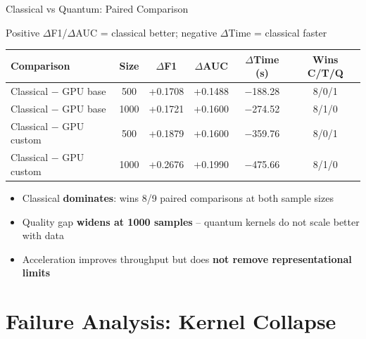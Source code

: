 \documentclass[10pt, aspectratio=169]{beamer}
\begin{document}
\begin{frame}{Classical vs Quantum: Paired Comparison}
    \begin{center}
    {\scriptsize Positive $\Delta$F1/$\Delta$AUC = classical better; negative $\Delta$Time = classical faster}
    \end{center}
    \vspace{-0.1cm}
    \begin{center}
    \small
    \begin{tabular}{lccccc}
        \toprule
        \textbf{Comparison} & \textbf{Size} & $\Delta$\textbf{F1} & $\Delta$\textbf{AUC} & $\Delta$\textbf{Time (s)} & \textbf{Wins C/T/Q} \\
        \midrule
        Classical $-$ GPU base   & 500  & +0.1708 & +0.1488 & $-$188.28 & 8/0/1 \\
        Classical $-$ GPU base   & 1000 & +0.1721 & +0.1600 & $-$274.52 & 8/1/0 \\
        Classical $-$ GPU custom & 500  & +0.1879 & +0.1600 & $-$359.76 & 8/0/1 \\
        Classical $-$ GPU custom & 1000 & +0.2676 & +0.1990 & $-$475.66 & 8/1/0 \\
        \bottomrule
    \end{tabular}
    \end{center}
    \vspace{0.2cm}
    \begin{itemize}
        \item Classical \textbf{dominates}: wins 8/9 paired comparisons at both sample sizes
        \item Quality gap \textbf{widens at 1000 samples} -- quantum kernels do not scale better with data
        \item Acceleration improves throughput but does \textbf{not remove representational limits}
    \end{itemize}
\end{frame}

\section{Failure Analysis: Kernel Collapse}
\end{document}

